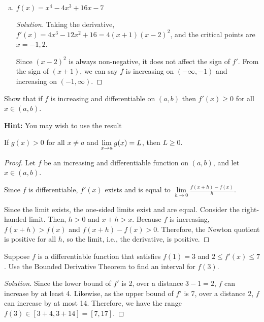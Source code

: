 \begin{enumerate}[(a)]
\begin{proof}[Solution]
\begin{align*}
            x     & = -x + 1   \\
            x     & = \frac12
          \end{align*}
          Therefore, our only critical point is at $x=\frac12$.
          For large positive $x$, the $e^x$ term dominates and for large negative $x$, the $e^{-x}$ term dominates.
          It follows that $f$ is decreasing on $(-\infty,\frac12)$ and increasing on $(\frac12,\infty)$.
        \end{proof}
  \item $f(x) = x^4 - 4x^3 + 16x - 7$
        \begin{proof}[Solution]
          Taking the derivative, $f'(x) = 4x^3 - 12x^2 + 16 = 4(x+1)(x-2)^2$,
          and the critical points are $x=-1,2$.

          Since $(x-2)^2$ is always non-negative, it does not affect the sign of $f'$.
          From the sign of $(x+1)$, we can say $f$ is increasing on $(-\infty,-1)$ and increasing on $(-1,\infty)$.
        \end{proof}
\end{enumerate}


\question Show that if $f$ is increasing and differentiable on $(a,b)$
then $f'(x) \geq 0$ for all $x\in(a,b)$.

\textbf{Hint:} You may wish to use the result \begin{center}
  If $g(x) > 0$ for all $x \neq a$ and $\displaystyle\lim_{x\to a}g(x)=L$, then $L \geq 0$.
\end{center}
\begin{proof}
  Let $f$ be an increasing and differentiable function on $(a,b)$, and let $x\in(a,b)$.

  Since $f$ is differentiable, $f'(x)$ exists and is equal to
  $\lim\limits_{h\to0}\frac{f(x+h)-f(x)}{h}$.

  Since the limit exists, the one-sided limits exist and are equal.
  Consider the right-handed limit. Then, $h > 0$ and $x+h > x$.
  Because $f$ is increasing, $f(x+h) > f(x)$ and $f(x+h)-f(x) > 0$.
  Therefore, the Newton quotient is positive for all $h$,
  so the limit, i.e., the derivative, is positive.
\end{proof}


\question Suppose $f$ is a differentiable function that satisfies $f(1) = 3$ and $2 \leq f'(x) \leq 7$.
Use the Bounded Derivative Theorem to find an interval for $f(3)$.
\begin{proof}[Solution]
  Since the lower bound of $f'$ is 2, over a distance $3-1=2$, $f$ can increase by at least 4.
  Likewise, as the upper bound of $f'$ is 7, over a distance 2, $f$ can increase by at most 14.
  Therefore, we have the range $f(3)\in[3+4,3+14] = [7,17]$.
\end{proof}


